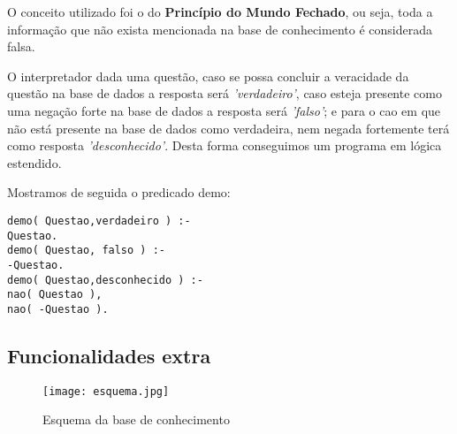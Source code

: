 O conceito utilizado foi o do \textbf{Princípio do Mundo Fechado}, ou seja, toda a informação que não exista mencionada na base de conhecimento é considerada falsa. 

O interpretador dada uma questão, caso se possa concluir a veracidade da questão na base de dados a resposta será \textit{'verdadeiro'}, caso esteja presente como uma negação forte na base de dados a resposta será \textit{'falso'}; e para o cao em que não está presente na base de dados como verdadeira, nem negada fortemente terá como resposta \textit{'desconhecido'}. Desta forma conseguimos um programa em lógica estendido. 

Mostramos de seguida o predicado demo: 
\begin{verbatim}
demo( Questao,verdadeiro ) :-
Questao.
demo( Questao, falso ) :-
-Questao.
demo( Questao,desconhecido ) :-
nao( Questao ),
nao( -Questao ).
\end{verbatim}

\subsection{Funcionalidades extra}

\begin{figure}[<+htpb+>]
	\centering
	\texttt{[image: esquema.jpg]}
	\caption{Esquema da base de conhecimento }
	\label{p3:fig:esquema1}
\end{figure}



